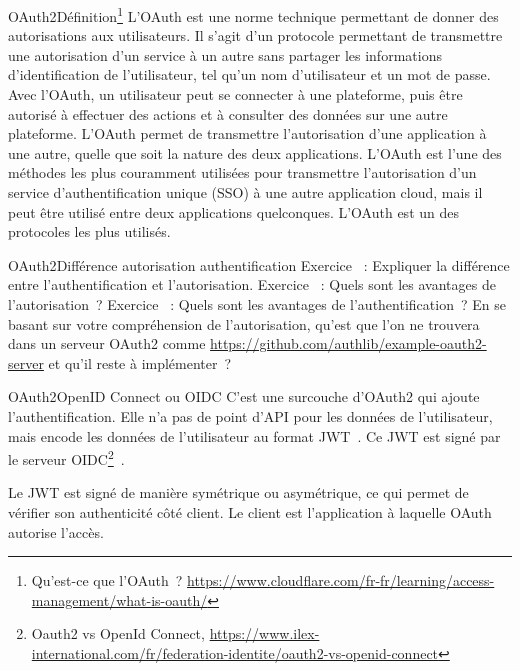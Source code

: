 \documentclass{beamer}
\begin{document}
    \begin{frame}{OAuth2}{Définition\footnote{Qu'est-ce que l'OAuth~? \url{https://www.cloudflare.com/fr-fr/learning/access-management/what-is-oauth/}}}
        L'OAuth est une norme technique permettant de donner des autorisations aux utilisateurs.
        Il s'agit d'un protocole permettant de transmettre une autorisation d'un service à un autre sans partager les informations d'identification de l'utilisateur, tel qu'un nom d'utilisateur et un mot de passe.
        Avec l'OAuth, un utilisateur peut se connecter à une plateforme, puis être autorisé à effectuer des actions et à consulter des données sur une autre plateforme.
        \bigbreak
        L'OAuth permet de transmettre l'autorisation d'une application à une autre, quelle que soit la nature des deux applications.
        L'OAuth est l'une des méthodes les plus couramment utilisées pour transmettre l'autorisation d'un service d'authentification unique (SSO) à une autre application cloud, mais il peut être utilisé entre deux applications quelconques.
        L'OAuth est un des protocoles les plus utilisés.
    \end{frame}

    \begin{frame}{OAuth2}{Différence autorisation authentification}
        Exercice \execcounterdispinc{}~:
        Expliquer la différence entre l'authentification et l'autorisation.
        \bigbreak
        Exercice \execcounterdispinc{}~:
        Quels sont les avantages de l'autorisation~?
        \bigbreak
        Exercice \execcounterdispinc{}~:
        Quels sont les avantages de l'authentification~?
        En se basant sur votre compréhension de l'autorisation, qu'est que l'on ne trouvera dans un serveur OAuth2 comme \url{https://github.com/authlib/example-oauth2-server} et qu'il reste à implémenter~?
    \end{frame}

    \begin{frame}{OAuth2}{OpenID Connect ou OIDC}
        C'est une surcouche d'OAuth2 qui ajoute l'authentification.
        Elle n'a pas de point d'API pour les données de l'utilisateur, mais encode les données de l'utilisateur au format JWT~.
        Ce JWT est signé par le serveur OIDC\footnote{Oauth2 vs OpenId Connect, \url{https://www.ilex-international.com/fr/federation-identite/oauth2-vs-openid-connect}}~.

        Le JWT est signé de manière symétrique ou asymétrique, ce qui permet de vérifier son authenticité côté client.
        \bigbreak
        Le client est l'application à laquelle OAuth autorise l'accès.
    \end{frame}
\end{document}
